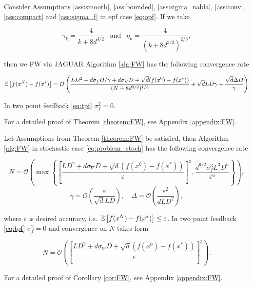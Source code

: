         \begin{theorem}
        \label{theorem:FW}
            Consider Assumptions \ref{ass:smooth}, \ref{ass:bounded}, \ref{ass:sigma_nabla}, \ref{ass:conv}, \ref{ass:compact} and \ref{ass:sigma_f} in opf case \eqref{eq:opf}.
            If we take 
            
            $$\gamma_k = \frac{4}{k + 8d^{3/2}} ~~\text{ and }~~ \eta_k = \frac{4}{(k + 8d^{3/2})^{2/3}},$$
            
            then we FW via JAGUAR Algorithm \ref{alg:FW} has the following convergence rate
    
            \begin{equation*}
                \mathbb{E}\left[ f(x^{N}) - f(x^*) \right] 
                =
                \mathcal{O} \left( \frac{L D^2 + d \sigma_f D/ \gamma + d\sigma_{\nabla} D + \sqrt{d} (f(x^0) - f(x^*))}{(N + 8d^{3/2})^{1/3}} 
                + \sqrt{d} L D \gamma + \frac{\sqrt{d} \Delta D}{\gamma}\right)
            \end{equation*}
    
            In two point feedback \eqref{eq:tpf} $\sigma^2_f = 0$.
            
        \end{theorem}
    
        For a detailed proof of Theorem \ref{theorem:FW}, see Appendix \ref{appendix:FW}.

        \begin{corollary}
        \label{cor:FW}
            Let Assumptions from Theorem \ref{theorem:FW} be satisfied, then Algorithm \ref{alg:FW} in stochastic case \eqref{eq:problem_stoch} has the following convergence rate

            \begin{equation*}
                N = \mathcal{O} \left( \max\left\{ \left[ \frac{L D^2 + d\sigma_{\nabla} D + \sqrt{d} (f(x^0) - f(x^*))}{\varepsilon}\right]^3 , \frac{d^{9/2} \sigma_f^3 L^3D^6}{\varepsilon^6} \right\}\right),
            \end{equation*}
            \begin{equation*}
                \gamma = \mathcal{O} \left(\frac{\varepsilon}{\sqrt{d} L D} \right), \quad
                \Delta = \mathcal{O} \left( \frac{\varepsilon^2}{d L D^2}\right),
            \end{equation*}

            where $\varepsilon$ is desired accuracy, i.e. $\mathbb{E}\left[ f(x^N) - f(x^*) \right] \leq \varepsilon$. In two point feedback \eqref{eq:tpf} $\sigma_f^2 = 0$ and convergence on $N$ takes form

            \begin{equation*}
                N = \mathcal{O} \left( \left[ \frac{L D^2 + d\sigma_{\nabla} D + \sqrt{d} (f(x^0) - f(x^*))}{\varepsilon}\right]^3 \right).
            \end{equation*}
        \end{corollary}

        For a detailed proof of Corollary \ref{cor:FW}, see Appendix \ref{appendix:FW}.